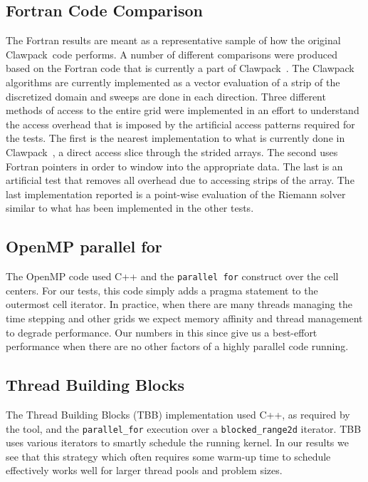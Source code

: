 \documentclass{article}
\def\clawpack{Clawpack~}
\begin{document}
\subsection{Fortran Code Comparison}

The Fortran results are meant as a representative sample of how the original
\clawpack code performs. A number of different comparisons were produced based
on the Fortran code that is currently a part of \clawpack. The \clawpack
algorithms are currently implemented as a vector evaluation of a strip of the
discretized domain and sweeps are done in each direction. Three different
methods of access to the entire grid were implemented in an effort to
understand the access overhead that is imposed by the artificial access
patterns required for the tests. The first is the nearest implementation to
what is currently done in \clawpack, a direct access slice through the strided
arrays. The second uses Fortran pointers in order to window into the
appropriate data. The last is an artificial test that removes all overhead due
to accessing strips of the array. The last implementation reported is a
point-wise evaluation of the Riemann solver similar to what has been
implemented in the other tests.


\subsection{OpenMP parallel for}

The OpenMP code used C++ and the {\tt parallel for} construct over the cell
centers. For our tests, this code simply adds a pragma statement to the outermost
cell iterator.  In practice, when there are many threads managing the
time stepping and other grids we expect memory affinity and thread management
to degrade performance.  Our numbers in this since give us a best-effort
performance when there are no other factors of a highly parallel code running.

\subsection{Thread Building Blocks}

The Thread Building Blocks (TBB) implementation used C++, as required by the tool,
and the {\tt parallel\_for} execution over a {\tt blocked\_range2d} iterator.
TBB uses various iterators to smartly schedule the running kernel.  In our
results we see that this strategy which often requires some warm-up time to
schedule effectively works well for larger thread pools and problem sizes.
\end{document}
